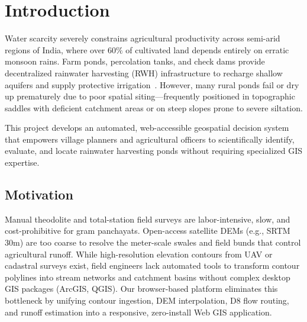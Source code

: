 \documentclass[manuscript,screen,review]{acmart}
\begin{document}

\maketitle

\begin{center}
  \vspace{-3mm}
  \noindent{}
  \vspace{1mm}
\end{center}

\section{Introduction}
\label{sec:intro}
Water scarcity severely constrains agricultural productivity across semi-arid regions of India, where over $60\%$ of cultivated land depends entirely on erratic monsoon rains. Farm ponds, percolation tanks, and check dams provide decentralized rainwater harvesting (RWH) infrastructure to recharge shallow aquifers and supply protective irrigation~\cite{critchley1991water}. However, many rural ponds fail or dry up prematurely due to poor spatial siting---frequently positioned in topographic saddles with deficient catchment areas or on steep slopes prone to severe siltation. 

This project develops an automated, web-accessible geospatial decision system that empowers village planners and agricultural officers to scientifically identify, evaluate, and locate rainwater harvesting ponds without requiring specialized GIS expertise.

\subsection{Motivation}
Manual theodolite and total-station field surveys are labor-intensive, slow, and cost-prohibitive for gram panchayats. Open-access satellite DEMs (e.g., SRTM 30m) are too coarse to resolve the meter-scale swales and field bunds that control agricultural runoff. While high-resolution elevation contours from UAV or cadastral surveys exist, field engineers lack automated tools to transform contour polylines into stream networks and catchment basins without complex desktop GIS packages (ArcGIS, QGIS). Our browser-based platform eliminates this bottleneck by unifying contour ingestion, DEM interpolation, D8 flow routing, and runoff estimation into a responsive, zero-install Web GIS application.
\end{document}

